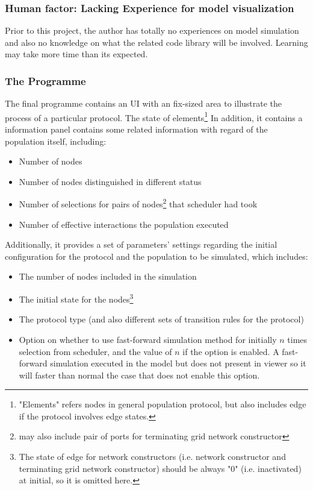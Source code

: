 \subsubsection{Human factor: Lacking Experience for model visualization}
\par\noindent
Prior to this project, the author has totally no experiences on model simulation and
also no knowledge on what the related code library will be involved. Learning may take
more time than its expected.

\subsubsection{The Programme}
\par\noindent
The final programme contains an UI with an fix-sized area to illustrate the process of
a particular protocol. The state of elements\footnote{\noindent "Elements" refers nodes in general population protocol,
but also includes edge if the protocol involves edge states.}
In addition, it contains a information panel contains some related
information with regard of the population itself, including:
\begin{itemize}
  \item Number of nodes
  \item Number of nodes distinguished in different status
  \item Number of selections for pairs of nodes\footnote{may also include pair of ports for terminating grid network constructor} that scheduler had took
  \item Number of effective interactions the population executed
\end{itemize}
\par\noindent
Additionally, it provides a set of parameters' settings regarding the initial configuration for the protocol and the population to be simulated, which includes:
\begin{itemize}
  \item The number of nodes included in the simulation
  \item The initial state for the nodes\footnote{\noindent The state of edge for network constructors (i.e. network constructor and terminating grid network constructor) should be always "0" (i.e. inactivated) at initial, so it is omitted here.}
  \item The protocol type (and also different sets of transition rules for the protocol)
  \item Option on whether to use fast-forward simulation method for initially $n$ times selection from scheduler, and the value of $n$ if the option is enabled.
  A fast-forward simulation executed in the model but does not present in viewer so it will faster than normal the case that does not enable this option.
\end{itemize}

